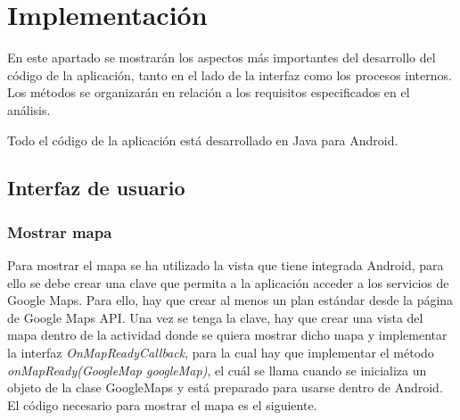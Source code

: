 \chapter{Implementación}

En este apartado se mostrarán los aspectos más importantes del desarrollo del código de la aplicación, tanto en el lado de la interfaz como los procesos internos. Los métodos se organizarán en relación a los requisitos especificados en el análisis.

Todo el código de la aplicación está desarrollado en Java para Android.

\section[Interfaz de usuario]{Interfaz de usuario}
\subsection{Mostrar mapa}
Para mostrar el mapa se ha utilizado la vista que tiene integrada Android, para ello se debe crear una clave que  permita a la aplicación acceder a los servicios de Google Maps. Para ello, hay que crear al menos un plan estándar desde la página de Google Maps API. Una vez se tenga la clave, hay que crear una vista del mapa dentro de la actividad donde se quiera mostrar dicho mapa y implementar la interfaz \textit{OnMapReadyCallback}, para la cual hay que implementar el método \textit{onMapReady(GoogleMap googleMap)}, el cuál se llama cuando se inicializa un objeto de la clase GoogleMaps y está preparado para usarse dentro de Android. El código necesario para mostrar el mapa es el siguiente.

